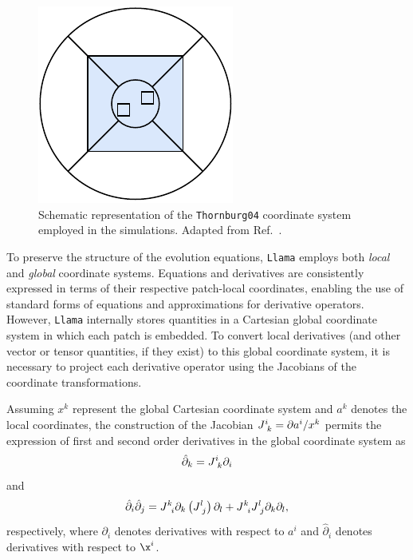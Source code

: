 \begin{figure}[h]
  \centering
  \includegraphics[width=\linewidth]{img/wave_scattering/multipatch_coords}
  \caption{Schematic representation of the \texttt{Thornburg04} coordinate system employed in the simulations. Adapted from Ref.~\cite{Reisswig2010}.}
  \label{fig:wave_scattering_multipatch_coords}
\end{figure}

To preserve the structure of the evolution equations, \texttt{Llama} employs both \textit{local} and \textit{global} coordinate systems. Equations and derivatives are consistently expressed in terms of their respective patch-local coordinates, enabling the use of standard forms of equations and approximations for derivative operators. However, \texttt{Llama} internally stores quantities in a Cartesian global coordinate system in which each patch is embedded. To convert local derivatives (and other vector or tensor quantities, if they exist) to this global coordinate system, it is necessary to project each derivative operator using the Jacobians of the coordinate transformations.

Assuming $x^k$ represent the global Cartesian coordinate system and $a^k$ denotes the local coordinates, the construction of the Jacobian $\tens{J}{i}{k} = \partial a^i / x^k$ permits the expression of first and second order derivatives in the global coordinate system as
%
\begin{equation}
  \hat{\partial}_k = \tens{J}{i}{k} \partial_i
  \label{eq:wave_scattering_projection_1}
\end{equation}
%
and
%
\begin{equation}
  \hat{\partial}_i \hat{\partial}_j = \tens{J}{k}{i} \partial_k \left( \tens{J}{l}{j} \right) \partial_l + \tens{J}{k}{i}\tens{J}{l}{j}\partial_k\partial_l,
  \label{eq:wave_scattering_projection_2}
\end{equation}
%
respectively, where $\partial_i$ denotes derivatives with respect to $a^i$ and $\hat{\partial}_i$ denotes derivatives with respect to $\x^i$.

